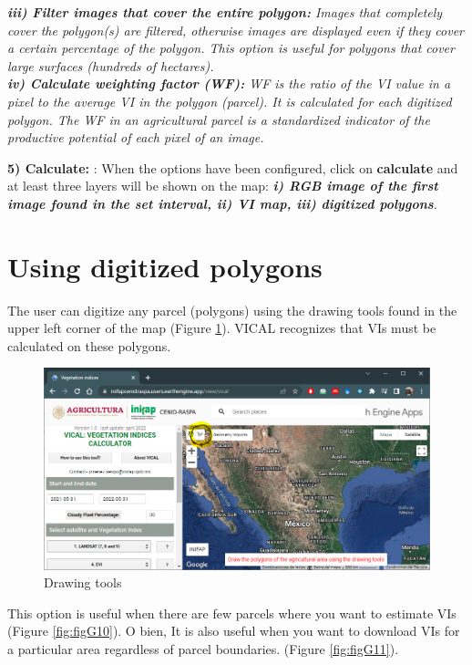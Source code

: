 \documentclass[
]{book}
\begin{document}
\emph{\textbf{iii) Filter images that cover the entire polygon:} Images that completely cover the polygon(s) are filtered, otherwise images are displayed even if they cover a certain percentage of the polygon. This option is useful for polygons that cover large surfaces (hundreds of hectares).}\\
\emph{\textbf{iv) Calculate weighting factor (WF):} WF is the ratio of the VI value in a pixel to the average VI in the polygon (parcel). It is calculated for each digitized polygon. The WF in an agricultural parcel is a standardized indicator of the productive potential of each pixel of an image. }

\textbf{5) Calculate: }: When the options have been configured, click on \textbf{calculate} and at least three layers will be shown on the map: \emph{\textbf{i) RGB image of the first image found in the set interval, ii) VI map, iii) digitized polygons}. }

\hypertarget{using-digitized-polygons}{%
\section{Using digitized polygons}\label{using-digitized-polygons}}

The user can digitize any parcel (polygons) using the drawing tools found in the upper left corner of the map (Figure \ref{fig:figG9}). VICAL recognizes that VIs must be calculated on these polygons.

\begin{figure}

{\centering \includegraphics[width=0.75\linewidth]{./images/Figure11} 

}

\caption{Drawing tools}\label{fig:figG9}
\end{figure}

This option is useful when there are few parcels where you want to estimate VIs (Figure \ref{fig:figG10}). O bien, It is also useful when you want to download VIs for a particular area regardless of parcel boundaries. (Figure \ref{fig:figG11}).
\end{document}
